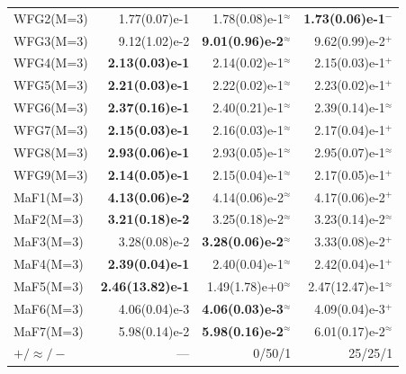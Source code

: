 \begin{table}[t]
\begin{tabular}{lrrr}
WFG2(M=3) & 1.77(0.07)e-1 & 1.78(0.08)e-1$^{\approx}$ & \textbf{1.73(0.06)e-1$^{-}$} \\
WFG3(M=3) & 9.12(1.02)e-2 & \textbf{9.01(0.96)e-2$^{\approx}$} & 9.62(0.99)e-2$^{+}$ \\
WFG4(M=3) & \textbf{2.13(0.03)e-1} & 2.14(0.02)e-1$^{\approx}$ & 2.15(0.03)e-1$^{+}$ \\
WFG5(M=3) & \textbf{2.21(0.03)e-1} & 2.22(0.02)e-1$^{\approx}$ & 2.23(0.02)e-1$^{+}$ \\
WFG6(M=3) & \textbf{2.37(0.16)e-1} & 2.40(0.21)e-1$^{\approx}$ & 2.39(0.14)e-1$^{\approx}$ \\
WFG7(M=3) & \textbf{2.15(0.03)e-1} & 2.16(0.03)e-1$^{\approx}$ & 2.17(0.04)e-1$^{+}$ \\
WFG8(M=3) & \textbf{2.93(0.06)e-1} & 2.93(0.05)e-1$^{\approx}$ & 2.95(0.07)e-1$^{\approx}$ \\
WFG9(M=3) & \textbf{2.14(0.05)e-1} & 2.15(0.04)e-1$^{\approx}$ & 2.17(0.05)e-1$^{+}$ \\
MaF1(M=3) & \textbf{4.13(0.06)e-2} & 4.14(0.06)e-2$^{\approx}$ & 4.17(0.06)e-2$^{+}$ \\
MaF2(M=3) & \textbf{3.21(0.18)e-2} & 3.25(0.18)e-2$^{\approx}$ & 3.23(0.14)e-2$^{\approx}$ \\
MaF3(M=3) & 3.28(0.08)e-2 & \textbf{3.28(0.06)e-2$^{\approx}$} & 3.33(0.08)e-2$^{+}$ \\
MaF4(M=3) & \textbf{2.39(0.04)e-1} & 2.40(0.04)e-1$^{\approx}$ & 2.42(0.04)e-1$^{+}$ \\
MaF5(M=3) & \textbf{2.46(13.82)e-1} & 1.49(1.78)e+0$^{\approx}$ & 2.47(12.47)e-1$^{\approx}$ \\
MaF6(M=3) & 4.06(0.04)e-3 & \textbf{4.06(0.03)e-3$^{\approx}$} & 4.09(0.04)e-3$^{+}$ \\
MaF7(M=3) & 5.98(0.14)e-2 & \textbf{5.98(0.16)e-2$^{\approx}$} & 6.01(0.17)e-2$^{\approx}$ \\
\midrule
$+ / \approx / -$ & --- & 0/50/1 & 25/25/1 \\
\bottomrule
\end{tabular}
\end{table}